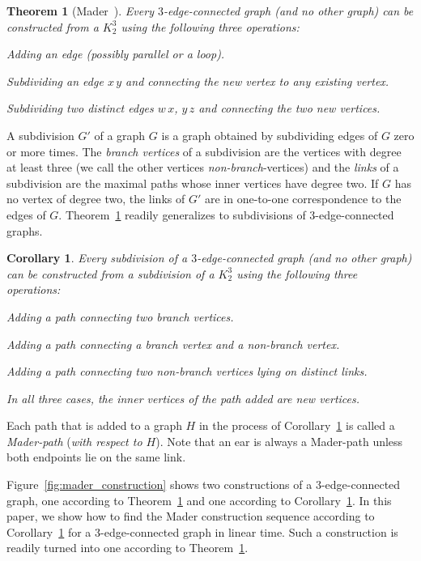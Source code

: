\documentclass[paper=a4]{scrartcl}
\newtheorem{theorem}{Theorem}
\newtheorem{corollary}{Corollary}
\newcommand{\edge}[2]{\ensuremath{#1\,#2}}
\begin{document}
\begin{theorem}[Mader~\cite{Mader1978}]\label{Mader}
Every $3$-edge-connected graph (and no other graph) can be constructed from a $K_2^3$ using the following three operations:
\begin{compactitem}
\item Adding an edge (possibly parallel or a loop).
\item Subdividing an edge $\edge{x}{y}$ and connecting the new vertex to any existing vertex.
\item Subdividing two distinct edges $\edge{w}{x}$, $\edge{y}{z}$ and connecting the two new vertices.
\end{compactitem}
\end{theorem}

A subdivision $G'$ of a graph $G$ is a graph obtained by subdividing edges of $G$ zero or more times. The \emph{branch vertices} of a subdivision are the vertices with degree at least three (we call the other vertices \emph{non-branch}-vertices) and the \emph{links} of a subdivision are the maximal paths whose inner vertices have degree two. If $G$ has no vertex of degree two, the links of $G'$ are in one-to-one correspondence to the edges of $G$. Theorem~\ref{Mader} readily generalizes to subdivisions of 3-edge-connected graphs.

\begin{corollary}\label{Mader-Cor}
Every subdivision of a $3$-edge-connected graph (and no other graph) can be constructed from a
subdivision of a $K_2^3$ using the following three operations:
\begin{compactitem}
\item Adding a path connecting two branch vertices.
\item Adding a path connecting a branch vertex and a non-branch vertex.
\item Adding a path connecting two non-branch vertices lying on distinct links.
\end{compactitem}
In all three cases, the inner vertices of the path added are new vertices.
\end{corollary}

Each path that is added to a graph $H$ in the process of Corollary~\ref{Mader-Cor} is called a \emph{Mader-path} (\emph{with respect to $H$}). Note that an ear is always a Mader-path unless both endpoints lie on the same link.

Figure~\ref{fig:mader_construction} shows two constructions of a $3$-edge-connected graph, one according to Theorem~\ref{Mader} and one according to Corollary~\ref{Mader-Cor}. In this paper, we show how to find the Mader construction sequence according to Corollary~\ref{Mader-Cor} for a 3-edge-connected graph in linear time. Such a construction is readily turned into one according to Theorem~\ref{Mader}.
\end{document}

